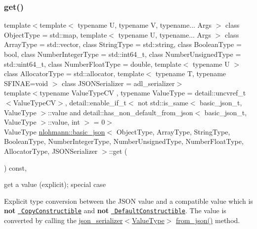 \subsubsection{\texorpdfstring{get()}{get()}\hspace{0.1cm}{\footnotesize\ttfamily [3/5]}}
{\footnotesize\ttfamily template$<$template$<$ typename U, typename V, typename... Args $>$ class Object\+Type = std\+::map, template$<$ typename U, typename... Args $>$ class Array\+Type = std\+::vector, class String\+Type  = std\+::string, class Boolean\+Type  = bool, class Number\+Integer\+Type  = std\+::int64\+\_\+t, class Number\+Unsigned\+Type  = std\+::uint64\+\_\+t, class Number\+Float\+Type  = double, template$<$ typename U $>$ class Allocator\+Type = std\+::allocator, template$<$ typename T, typename S\+F\+I\+N\+A\+E=void $>$ class J\+S\+O\+N\+Serializer = adl\+\_\+serializer$>$ \\
template$<$typename Value\+Type\+CV , typename Value\+Type  = detail\+::uncvref\+\_\+t$<$\+Value\+Type\+C\+V$>$, detail\+::enable\+\_\+if\+\_\+t$<$ not std\+::is\+\_\+same$<$ basic\+\_\+json\+\_\+t, Value\+Type $>$\+::value and detail\+::has\+\_\+non\+\_\+default\+\_\+from\+\_\+json$<$ basic\+\_\+json\+\_\+t, Value\+Type $>$\+::value, int $>$  = 0$>$ \\
Value\+Type \mbox{\hyperlink{classnlohmann_1_1basic__json}{nlohmann\+::basic\+\_\+json}}$<$ Object\+Type, Array\+Type, String\+Type, Boolean\+Type, Number\+Integer\+Type, Number\+Unsigned\+Type, Number\+Float\+Type, Allocator\+Type, J\+S\+O\+N\+Serializer $>$\+::get (\begin{DoxyParamCaption}{ }\end{DoxyParamCaption}) const\hspace{0.3cm}{\ttfamily [inline]}, {\ttfamily [noexcept]}}



get a value (explicit); special case 

Explicit type conversion between the J\+S\+ON value and a compatible value which is {\bfseries{not}} \href{http://en.cppreference.com/w/cpp/concept/CopyConstructible}{\texttt{ Copy\+Constructible}} and {\bfseries{not}} \href{http://en.cppreference.com/w/cpp/concept/DefaultConstructible}{\texttt{ Default\+Constructible}}. The value is converted by calling the \mbox{\hyperlink{classnlohmann_1_1basic__json_a7768841baaaa7a21098a401c932efaff}{json\+\_\+serializer$<$\+Value\+Type$>$}} {\ttfamily \mbox{\hyperlink{namespacenlohmann_1_1detail_a839b0ab50d2c9bce669068f56bc41202}{from\+\_\+json()}}} method.

